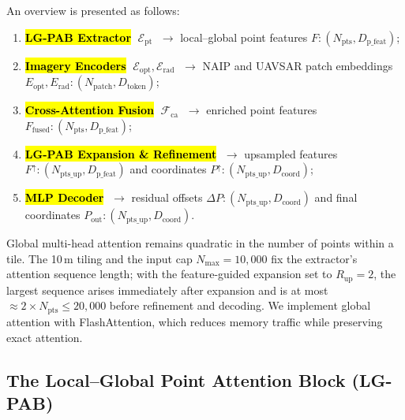 \documentclass[remotesensing,article,accept,pdftex,moreauthors]{Definitions/mdpi}
\begin{document}
An overview is presented as follows:

\begin{enumerate}[leftmargin=*]
\item \textbf{\hl{LG-PAB Extractor} %
} $\;\mathcal{E}_{\mathrm{pt}}$
      $\;\rightarrow$ local–global point features $F: (N_{\text{pts}}, D_{\text{p\_feat}})$;
\item \textbf{\hl{Imagery Encoders}} $\;\mathcal{E}_{\mathrm{opt}},\mathcal{E}_{\mathrm{rad}}$
      $\;\rightarrow$ NAIP and UAVSAR patch embeddings $E_{\text{opt}}, E_{\text{rad}}: (N_{\text{patch}}, D_{\text{token}})$;
\item \textbf{\hl{Cross-Attention Fusion}} $\;\mathcal{F}_{\mathrm{ca}}$
      $\;\rightarrow$ enriched point features $F_{\!\mathrm{fused}}: (N_{\text{pts}}, D_{\text{p\_feat}})$;
\item \textbf{\hl{LG-PAB Expansion \& Refinement}}
      $\;\rightarrow$ upsampled features $F^{\uparrow}: (N_{\text{pts\_up}}, D_{\text{p\_feat}})$ and coordinates $P^{\uparrow}: (N_{\text{pts\_up}}, D_{\text{coord}})$;
\item \textbf{\hl{MLP Decoder}} $\;\rightarrow$ residual offsets $\Delta P: (N_{\text{pts\_up}}, D_{\text{coord}})$ and final coordinates $P_{\mathrm{out}}: (N_{\text{pts\_up}}, D_{\text{coord}})$.
\end{enumerate}

Global multi-head attention remains quadratic in the number of points within a tile. The 10\,m tiling and the input cap $N_{\max}=10{,}000$ fix the extractor’s attention sequence length; with the feature-guided expansion set to $R_{\text{up}}=2$, the largest sequence arises immediately after expansion and is at most $\approx 2\times N_{\text{pts}} \le 20{,}000$ before refinement and decoding. We implement global attention with FlashAttention, which reduces memory traffic while preserving exact attention.

\subsection{The Local–Global Point Attention Block (LG-PAB)}
\label{sec:lgpab}

\end{document}
